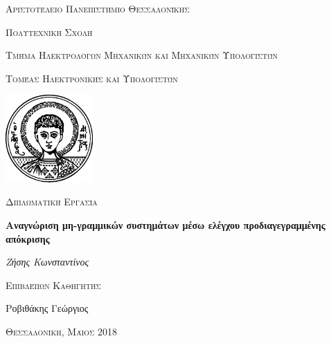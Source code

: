 \documentclass[12pt]{report}
\theoremstyle{definition}
\begin{document}

\begin{titlepage}
	\centering
	{\scshape\Large Αριστοτέλειο Πανεπιστήμιο Θεσσαλονίκης \par}
	{\scshape\Large Πολυτεχνική Σχολή \par}
	{\scshape\Large Τμήμα Ηλεκτρολόγων Μηχανικών και Μηχανικών Υπολογιστών \par}
	{\scshape\Large Τομέας Ηλεκτρονικής και Υπολογιστών \par}
	\vspace{0.5cm}
	\includegraphics[width=0.25\textwidth]{LogoAUTHblack} \par
	\vspace{1cm}
	{\scshape\Large Διπλωματική Εργασία \par}
	\vspace{0.3cm}
	{\huge\bfseries Αναγνώριση μη-γραμμικών συστημάτων μέσω ελέγχου προδιαγεγραμμένης απόκρισης \par}
	\vspace{2cm}
	{\Large\itshape Ζήσης Κωνσταντίνος \par}
	\vfill
	{\scshape\large Επιβλέπων Καθηγητής \par}
	{\large Ροβιθάκης Γεώργιος}
	\vfill
	{\scshape\large Θεσσαλονίκη, Μάιος 2018\par}
\end{titlepage}

\digital
\else
\fi

\pagestyle{fancy}
\fancyhf{}
\fancyhead[L]{\textit{ \nouppercase{\leftmark}} }
\fancyhead[R]{\textit{ \nouppercase{\rightmark}} }
\digital
	\fancyfoot[C]{\thepage}
\else
	\fancyfoot[LE,RO]{\thepage}
\fi
\end{document}
